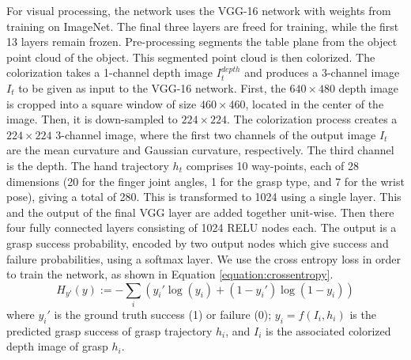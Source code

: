 For visual processing, the network uses the VGG-16 network with weights from training on ImageNet. The final three layers are freed for training, while the first 13 layers remain frozen. Pre-processing segments the table plane from the object point cloud of the object. This segmented point cloud is then colorized. The colorization takes a 1-channel depth image $I_{t}^{depth}$ and produces a 3-channel image $I_t$ to be given as input to the VGG-16 network. First, the $640 \times 480$ depth image is cropped into a square window of size $460 \times 460$, located in the center of the image. Then, it is down-sampled to $224 \times 224$. The colorization process creates a $224 \times 224$ 3-channel image, where the first two channels of the output image $I_t$ are the mean curvature and Gaussian curvature, respectively. The third channel is the depth. %
The hand trajectory $h_t$ comprises 10 way-points, each of 28 dimensions (20 for the finger joint angles, 1 for the grasp type, and 7 for the wrist pose), giving a total of 280. This is transformed to 1024 using a single layer. This and the output of the final VGG layer are added together unit-wise. Then there four fully connected layers consisting of 1024 RELU nodes each. The output is a grasp success probability, encoded by two output nodes which give success and failure probabilities, using a softmax layer.  We use the cross entropy loss in order to train the network, as shown in Equation \ref{equation:crossentropy}.
\begin{equation}
H_{y'}(y) := - \sum_{i} ({y_i' \log(y_i) + (1-y_i') \log (1-y_i)})
\label{equation:crossentropy}
\end{equation}
where $y_i'$ is the ground truth success (1) or failure (0); $y_i = f(I_i, h_i)$ is the predicted grasp success of grasp trajectory $h_i$, and $I_i$ is the associated colorized depth image of grasp $h_i$.
